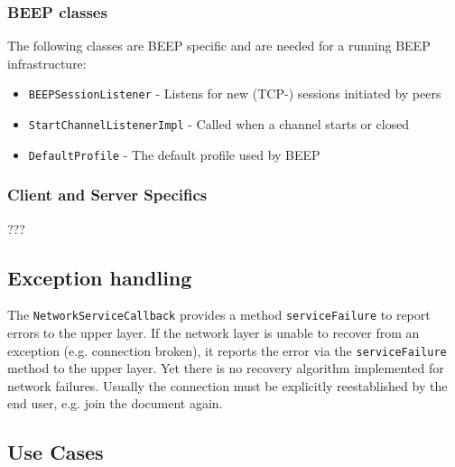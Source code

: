 \subsubsection{BEEP classes}
The following classes are BEEP specific and are needed for a running BEEP infrastructure:

\begin{itemize}
\item \texttt{BEEPSessionListener}		- 	Listens for new (TCP-) sessions initiated by peers
\item \texttt{StartChannelListenerImpl} 	-	Called when a channel starts or closed 
\item \texttt{DefaultProfile}				-	The default profile used by BEEP
\end{itemize}


\subsubsection{Client and Server Specifics}
???

\subsection{Exception handling}
\label{chapter:network.exceptionhandling}
The \texttt{NetworkServiceCallback} provides a method \texttt{serviceFailure} to report errors to the upper layer. If the network layer is unable to recover from an exception (e.g. connection broken), it reports the error via the \texttt{serviceFailure} method to the upper layer. Yet there is no recovery algorithm implemented for network failures. Usually the connection must be explicitly reestablished by the end user, e.g. join the document again.


\subsection{Use Cases}
\label{chaper:protocol.usecases}



